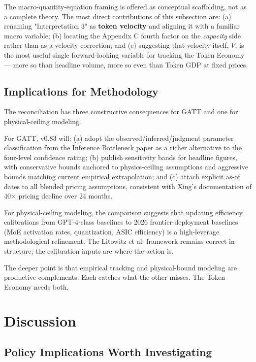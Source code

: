 \documentclass[11pt,a4paper]{article}
\begin{document}
The macro-quantity-equation framing is offered as conceptual scaffolding, not as a complete theory. The most direct contributions of this subsection are: (a) renaming "Interpretation 3" as \textbf{token velocity} and aligning it with a familiar macro variable; (b) locating the Appendix C fourth factor on the \emph{capacity} side rather than as a velocity correction; and (c) suggesting that velocity itself, $V$, is the most useful single forward-looking variable for tracking the Token Economy --- more so than headline volume, more so even than Token GDP at fixed prices.

\subsection{Implications for Methodology}

The reconciliation has three constructive consequences for GATT and one for physical-ceiling modeling.

For GATT, v0.83 will: (a) adopt the observed/inferred/judgment parameter classification from the Inference Bottleneck paper \cite{inference2026bottleneck} as a richer alternative to the four-level confidence rating; (b) publish sensitivity bands for headline figures, with conservative bounds anchored to physics-ceiling assumptions and aggressive bounds matching current empirical extrapolation; and (c) attach explicit as-of dates to all blended pricing assumptions, consistent with Xing's \cite{xing2026token} documentation of 40× pricing decline over 24 months.

For physical-ceiling modeling, the comparison suggests that updating efficiency calibrations from GPT-4-class baselines to 2026 frontier-deployment baselines (MoE activation rates, quantization, ASIC efficiency) is a high-leverage methodological refinement. The Litowitz et al. framework remains correct in structure; the calibration inputs are where the action is.

The deeper point is that empirical tracking and physical-bound modeling are productive complements. Each catches what the other misses. The Token Economy needs both.


\section{Discussion}

\subsection{Policy Implications Worth Investigating}
\end{document}
